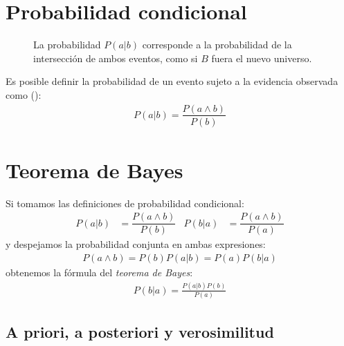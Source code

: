 \section{Probabilidad condicional}

\begin{figure}
  \centering
  \def\firstcircle{(0,0) circle (1.5cm)}
  \def\secondcircle{(0:2cm) circle (1.5cm)}
  \def\universesquare{(-2,-2) rectangle (4,2)}
  \caption{La probabilidad $P(a | b)$ corresponde a la probabilidad de la intersección de ambos eventos, como si $B$ fuera el nuevo universo.}\label{fig:p_cond}
\end{figure}

Es posible definir la probabilidad de un evento sujeto a la evidencia observada como ():
\begin{align}
 P(a|b) = \dfrac{P(a \land b)}{P(b)} \label{eq:p_cond}
\end{align}

\section{Teorema de Bayes}

Si tomamos las definiciones de probabilidad condicional:
\begin{align}
 P(a|b) &= \dfrac{P(a \land b)}{P(b)} & P(b|a) &= \dfrac{P(a \land b)}{P(a)}
\end{align}
y despejamos la probabilidad conjunta en ambas expresiones:
\begin{align}
 P(a \land b) = P(b) P(a|b) = P(a) P(b|a)
\end{align}
obtenemos la fórmula del \emph{teorema de Bayes}:
\begin{align}
 P(b|a) = \frac{P(a|b)P(b)}{P(a)}
\end{align}

\subsection{A priori, a posteriori y verosimilitud}

